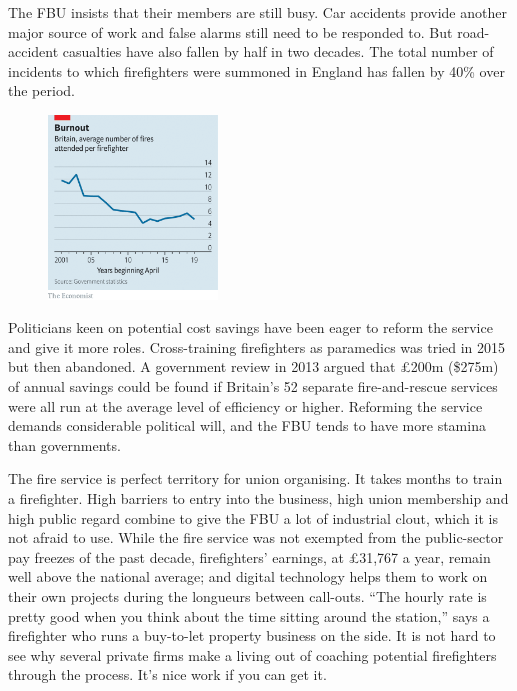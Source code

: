 \documentclass{article}
\begin{document}
The FBU insists that their members are still busy. Car accidents provide another major source of work and false alarms still need to be responded to. But road-accident casualties have also fallen by half in two decades. The total number of incidents to which firefighters were summoned in England has fallen by 40\% over the period. 

\begin{figure}[h]
\centering
\includegraphics[width=0.4\textwidth]{images/20210327_BRC269.png}
\end{figure}


Politicians keen on potential cost savings have been eager to reform the service and give it more roles. Cross-training firefighters as paramedics was tried in 2015 but then abandoned. A government review in 2013 argued that £200m (\$275m) of annual savings could be found if Britain's 52 separate fire-and-rescue services were all run at the average level of efficiency or higher. Reforming the service demands considerable political will, and the FBU tends to have more stamina than governments. 

The fire service is perfect territory for union organising. It takes months to train a firefighter. High barriers to entry into the business, high union membership and high public regard combine to give the FBU a lot of industrial clout, which it is not afraid to use. While the fire service was not exempted from the public-sector pay freezes of the past decade, firefighters' earnings, at £31,767 a year, remain well above the national average; and digital technology helps them to work on their own projects during the longueurs between call-outs. ``The hourly rate is pretty good when you think about the time sitting around the station,'' says a firefighter who runs a buy-to-let property business on the side. It is not hard to see why several private firms make a living out of coaching potential firefighters through the process. It's nice work if you can get it. {} 
\clearpage
\end{document}
